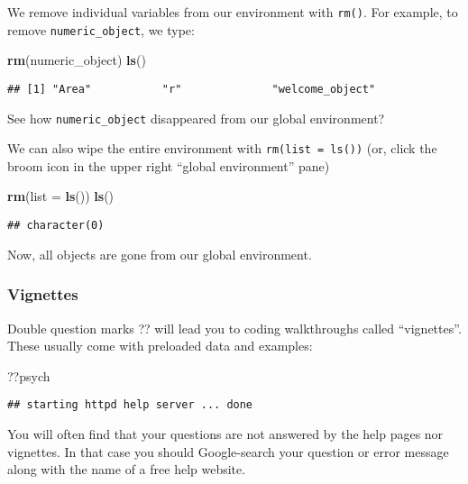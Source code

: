 \documentclass[]{article}
\newenvironment{Shaded}{\begin{snugshade}}{\end{snugshade}}
\newcommand{\KeywordTok}[1]{\textcolor[rgb]{0.13,0.29,0.53}{\textbf{#1}}}
\newcommand{\DataTypeTok}[1]{\textcolor[rgb]{0.13,0.29,0.53}{#1}}
\newcommand{\NormalTok}[1]{#1}
\begin{document}
We remove individual variables from our environment with \texttt{rm()}.
For example, to remove \texttt{numeric\_object}, we type:

\begin{Shaded}
\begin{Highlighting}[]
\KeywordTok{rm}\NormalTok{(numeric_object)}
\KeywordTok{ls}\NormalTok{()}
\end{Highlighting}
\end{Shaded}

\begin{verbatim}
## [1] "Area"           "r"              "welcome_object"
\end{verbatim}

See how \texttt{numeric\_object} disappeared from our global
environment?

We can also wipe the entire environment with \texttt{rm(list\ =\ ls())}
(or, click the broom icon in the upper right ``global environment''
pane)

\begin{Shaded}
\begin{Highlighting}[]
\KeywordTok{rm}\NormalTok{(}\DataTypeTok{list =} \KeywordTok{ls}\NormalTok{()) }
\KeywordTok{ls}\NormalTok{()}
\end{Highlighting}
\end{Shaded}

\begin{verbatim}
## character(0)
\end{verbatim}

Now, all objects are gone from our global environment.

\subsubsection{Vignettes}\label{vignettes}

Double question marks ?? will lead you to coding walkthroughs called
``vignettes''. These usually come with preloaded data and examples:

\begin{Shaded}
\begin{Highlighting}[]
\NormalTok{??psych}
\end{Highlighting}
\end{Shaded}

\begin{verbatim}
## starting httpd help server ... done
\end{verbatim}

You will often find that your questions are not answered by the help
pages nor vignettes. In that case you should Google-search your question
or error message along with the name of a free help website.
\end{document}
